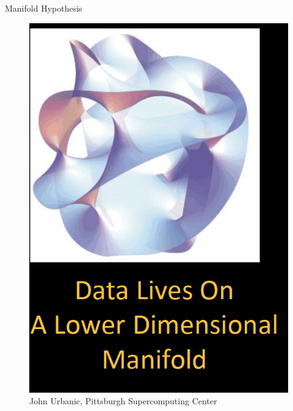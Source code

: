 \documentclass{beamer}
\begin{document}
\begin{frame}{Manifold Hypothesis}
		\begin{figure}[h]
		\centering
		\includegraphics[scale=0.4]{Figures/manifold_hyp.png}
		\caption{John Urbanic, Pittsburgh Supercomputing Center}
	\end{figure}
\end{frame}
\end{document}
